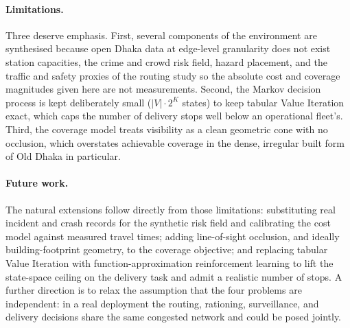 \documentclass{ai-lab-report}
\begin{document}
\paragraph{Limitations.} Three deserve emphasis. First, several
components of the environment are synthesised because open Dhaka
data at edge-level granularity does not exist  station capacities,
the crime and crowd risk field, hazard placement, and the traffic
and safety proxies of the routing study  so the absolute cost and
coverage magnitudes given here are not measurements. Second, the
Markov decision process is kept deliberately small
($|V| \cdot 2^{K}$ states) to keep tabular Value Iteration exact,
which caps the number of delivery stops well below an operational
fleet's. Third, the coverage model treats visibility as a clean
geometric cone with no occlusion, which overstates achievable
coverage in the dense, irregular built form of Old Dhaka in
particular.

\paragraph{Future work.} The natural extensions follow directly
from those limitations: substituting real incident and crash
records for the synthetic risk field and calibrating the cost model
against measured travel times; adding line-of-sight occlusion, and
ideally building-footprint geometry, to the coverage objective; and
replacing tabular Value Iteration with function-approximation
reinforcement learning to lift the state-space ceiling on the
delivery task and admit a realistic number of stops. A further
direction is to relax the assumption that the four problems are
independent: in a real deployment the routing, rationing,
surveillance, and delivery decisions share the same congested
network and could be posed jointly.


\end{document}
